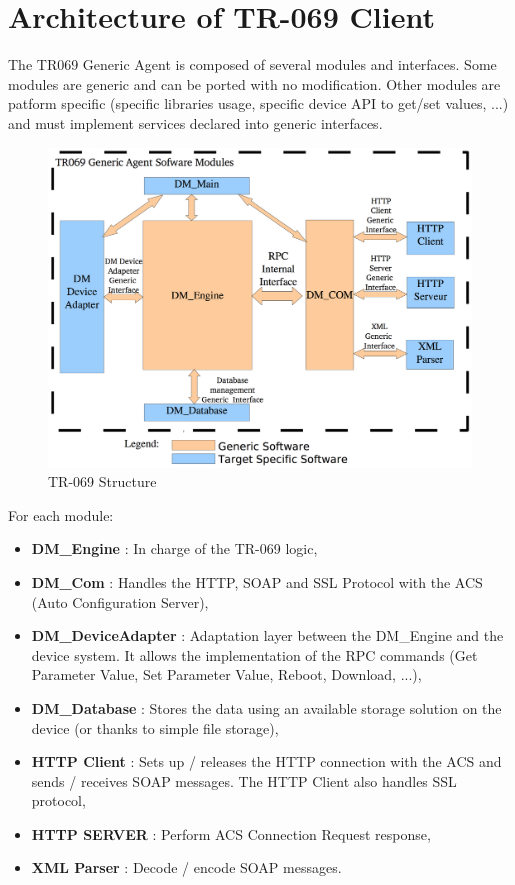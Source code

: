 \section{Architecture of TR-069 Client}
The TR069 Generic Agent is composed of several modules and interfaces. Some modules are generic and can be ported with no modification. Other modules are patform specific (specific libraries usage, specific device API to get/set values, ...) and must implement services declared into generic interfaces.

\begin{figure}[htbp]
	\centering
		\includegraphics[width=12cm]{Figures/structuretr069.png}
	\caption[TR-069 Structure]{TR-069 Structure}
	\label{fig:tr069}
\end{figure}

For each module:
\begin{itemize}
  \item \textbf{DM_Engine} : In charge of the TR-069 logic,
  \item \textbf{DM_Com} : Handles the HTTP, SOAP and SSL Protocol with the ACS (Auto Configuration Server),
  \item \textbf{DM_DeviceAdapter} : Adaptation layer between the DM_Engine and the device system. It allows the implementation of the RPC commands (Get Parameter Value, Set Parameter Value, Reboot, Download, ...),
  \item \textbf{DM_Database} : Stores the data using an available storage solution on the device (or thanks to simple file storage),
  \item \textbf{HTTP Client} : Sets up / releases the HTTP connection with the ACS and sends / receives SOAP messages. The HTTP Client also handles SSL protocol,
  \item \textbf{HTTP SERVER} : Perform ACS Connection Request response,
  \item \textbf{XML Parser} : Decode / encode SOAP messages.
\end{itemize}

